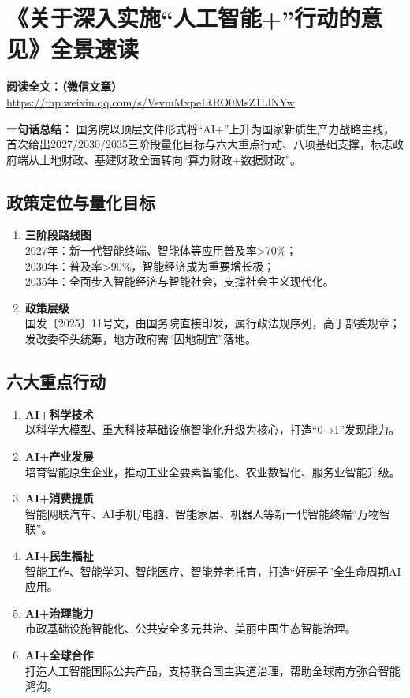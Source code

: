 \clearpage

\section{《关于深入实施“人工智能+”行动的意见》全景速读}
\vspace{1cm}
\noindent\textbf{阅读全文：（微信文章）} \url{https://mp.weixin.qq.com/s/VsvmMxpeLtRO0MsZ1LlNYw}

\textbf{一句话总结：}  
国务院以顶层文件形式将“AI+”上升为国家新质生产力战略主线，首次给出2027/2030/2035三阶段量化目标与六大重点行动、八项基础支撑，标志政府端从土地财政、基建财政全面转向“算力财政+数据财政”。

\subsection{政策定位与量化目标}
\begin{enumerate}[leftmargin=*, nosep]
    \item \textbf{三阶段路线图}  \\
    2027年：新一代智能终端、智能体等应用普及率>70\%；  \\
    2030年：普及率>90\%，智能经济成为重要增长极；  \\
    2035年：全面步入智能经济与智能社会，支撑社会主义现代化。
    \item \textbf{政策层级}  \\
    国发〔2025〕11号文，由国务院直接印发，属行政法规序列，高于部委规章；发改委牵头统筹，地方政府需“因地制宜”落地。
\end{enumerate}

\subsection{六大重点行动}
\begin{enumerate}[leftmargin=*, nosep]
    \item \textbf{AI+科学技术}  \\
    以科学大模型、重大科技基础设施智能化升级为核心，打造“0→1”发现能力。
    \item \textbf{AI+产业发展}  \\
    培育智能原生企业，推动工业全要素智能化、农业数智化、服务业智能升级。
    \item \textbf{AI+消费提质}  \\
    智能网联汽车、AI手机/电脑、智能家居、机器人等新一代智能终端“万物智联”。
    \item \textbf{AI+民生福祉}  \\
    智能工作、智能学习、智能医疗、智能养老托育，打造“好房子”全生命周期AI应用。
    \item \textbf{AI+治理能力}  \\
    市政基础设施智能化、公共安全多元共治、美丽中国生态智能治理。
    \item \textbf{AI+全球合作}  \\
    打造人工智能国际公共产品，支持联合国主渠道治理，帮助全球南方弥合智能鸿沟。
\end{enumerate}

